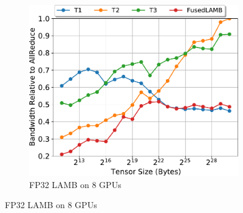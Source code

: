 \begin{figure}
\begin{subfigure}{0.66\columnwidth}
    \includegraphics[width=\columnwidth]{figures/results-lamb-8-gpus.pdf}  
    \caption{FP32 LAMB on 8 GPUs}
  \end{subfigure}


\end{figure}
